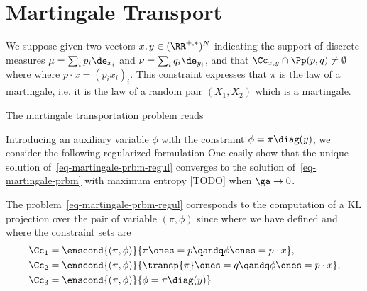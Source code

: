 
\section{Martingale Transport}
\label{sec-martingale}


We suppose given two vectors $x, y \in (\RR^{+,*})^N$ indicating the support of discrete measures $\mu=\sum_i p_i \de_{x_i}$ and $\nu = \sum_i q_i \de_{y_i}$, and that $\Cc_{x,y} \cap \Pp(p,q) \neq \emptyset$ where
where $p \cdot x = (p_i x_i)_i$. This constraint expresses that $\pi$ is the law of a martingale, i.e. it is the law of a random pair $(X_1,X_2)$  which is a martingale.

The martingale transportation problem reads

Introducing an auxiliary variable $\phi$ with the constraint $\phi=\pi \diag(y)$, we consider the following regularized formulation
One easily show that the unique solution of~\eqref{eq-martingale-prbm-regul} converges to the solution of~\eqref{eq-martingale-prbm} with maximum entropy [TODO] when $\ga \rightarrow 0$.

The problem~\eqref{eq-martingale-prbm-regul} corresponds to the computation of a KL projection over the pair of variable $(\pi,\phi)$ since
where we have defined
and where the constraint sets are
\begin{align*}
	\Cc_1 &= \enscond{ (\pi,\phi) }{ \pi \ones = p \qandq \phi \ones = p \cdot x }, \\
	\Cc_2 &= \enscond{ (\pi,\phi) }{ \transp{\pi} \ones = q \qandq \phi \ones = p \cdot x }, \\
	\Cc_3 &= \enscond{ (\pi,\phi) }{ \phi=\pi \diag(y) }
\end{align*}

